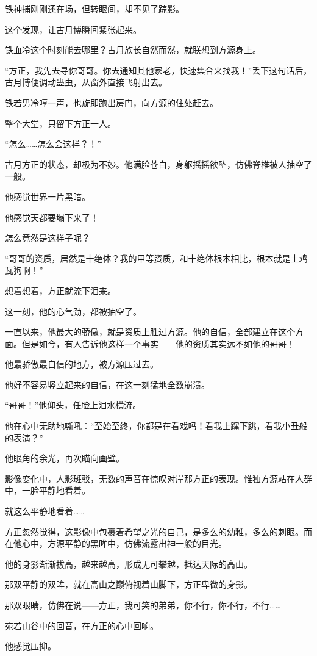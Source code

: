 \begin{this_body}
铁神捕刚刚还在场，但转眼间，却不见了踪影。

这个发现，让古月博瞬间紧张起来。

铁血冷这个时刻能去哪里？古月族长自然而然，就联想到方源身上。

“方正，我先去寻你哥哥。你去通知其他家老，快速集合来找我！”丢下这句话后，古月博便调动蛊虫，从窗外直接飞射出去。

铁若男冷哼一声，也旋即跑出房门，向方源的住处赶去。

整个大堂，只留下方正一人。

“怎么……怎么会这样？！”

古月方正的状态，却极为不妙。他满脸苍白，身躯摇摇欲坠，仿佛脊椎被人抽空了一般。

他感觉世界一片黑暗。

他感觉天都要塌下来了！

怎么竟然是这样子呢？

“哥哥的资质，居然是十绝体？我的甲等资质，和十绝体根本相比，根本就是土鸡瓦狗啊！”

想着想着，方正就流下泪来。

这一刻，他的心气劲，都被抽空了。

一直以来，他最大的骄傲，就是资质上胜过方源。他的自信，全部建立在这个方面。但是如今，有人告诉他这样一个事实——他的资质其实远不如他的哥哥！

他最骄傲最自信的地方，被方源压过去。

他好不容易竖立起来的自信，在这一刻猛地全数崩溃。

“哥哥！”他仰头，任脸上泪水横流。

他在心中无助地嘶吼：“至始至终，你都是在看戏吗！看我上蹿下跳，看我小丑般的表演？”

他眼角的余光，再次瞄向画壁。

影像变化中，人影斑驳，无数的声音在惊叹对岸那方正的表现。惟独方源站在人群中，一脸平静地看着。

就这么平静地看着……

方正忽然觉得，这影像中包裹着希望之光的自己，是多么的幼稚，多么的刺眼。而在他心中，方源平静的黑眸中，仿佛流露出神一般的目光。

他的身影渐渐拔高，越来越高，形成无可攀越，抵达天际的高山。

那双平静的双眸，就在高山之巅俯视着山脚下，方正卑微的身影。

那双眼睛，仿佛在说——方正，我可笑的弟弟，你不行，你不行，不行……

宛若山谷中的回音，在方正的心中回响。

他感觉压抑。


\end{this_body}
